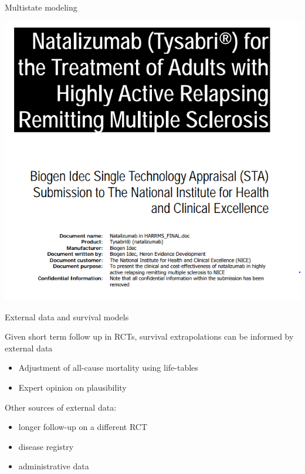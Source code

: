 \documentclass[
  ignorenonframetext,
]{beamer}
\providecommand{\tightlist}{%
  \setlength{\itemsep}{0pt}\setlength{\parskip}{0pt}}
\begin{document}
\begin{frame}{Multistate modeling}
\protect\hypertarget{multistate-modeling-6}{}

\includegraphics[width=0.8\linewidth]{figures/msmnice}

\end{frame}

\begin{frame}{External data and survival models}
\protect\hypertarget{external-data-and-survival-models}{}

Given short term follow up in RCTs, survival extrapolations can be
informed by external data

\begin{itemize}
\tightlist
\item
  Adjustment of all-cause mortality using life-tables
\item
  Expert opinion on plausibility
\end{itemize}

Other sources of external data:

\begin{itemize}
\tightlist
\item
  longer follow-up on a different RCT
\item
  disease registry
\item
  administrative data
\end{itemize}

\end{frame}
\end{document}
